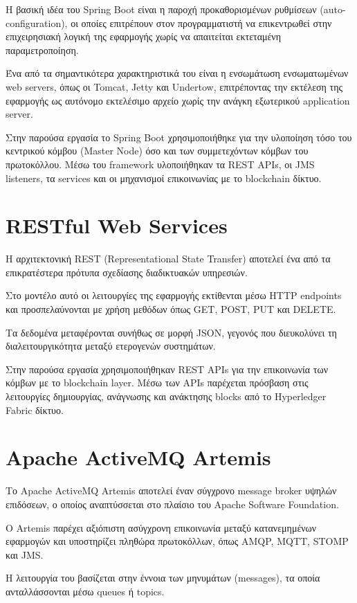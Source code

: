 \documentclass[12pt,a4paper]{report}
\begin{document}
Η βασική ιδέα του Spring Boot είναι η παροχή προκαθορισμένων
ρυθμίσεων (auto-configuration), οι οποίες επιτρέπουν στον
προγραμματιστή να επικεντρωθεί στην επιχειρησιακή λογική της
εφαρμογής χωρίς να απαιτείται εκτεταμένη παραμετροποίηση.

Ένα από τα σημαντικότερα χαρακτηριστικά του είναι η ενσωμάτωση
ενσωματωμένων web servers, όπως οι Tomcat, Jetty και Undertow,
επιτρέποντας την εκτέλεση της εφαρμογής ως αυτόνομο εκτελέσιμο
αρχείο χωρίς την ανάγκη εξωτερικού application server.

Στην παρούσα εργασία το Spring Boot χρησιμοποιήθηκε για την
υλοποίηση τόσο του κεντρικού κόμβου (Master Node) όσο και των
συμμετεχόντων κόμβων του πρωτοκόλλου. Μέσω του framework
υλοποιήθηκαν τα REST APIs, οι JMS listeners, τα services και
οι μηχανισμοί επικοινωνίας με το blockchain δίκτυο.

\section{RESTful Web Services}

Η αρχιτεκτονική REST (Representational State Transfer) αποτελεί
ένα από τα επικρατέστερα πρότυπα σχεδίασης διαδικτυακών υπηρεσιών.

Στο μοντέλο αυτό οι λειτουργίες της εφαρμογής εκτίθενται μέσω
HTTP endpoints και προσπελαύνονται με χρήση μεθόδων όπως GET,
POST, PUT και DELETE.

Τα δεδομένα μεταφέρονται συνήθως σε μορφή JSON, γεγονός που
διευκολύνει τη διαλειτουργικότητα μεταξύ ετερογενών συστημάτων.

Στην παρούσα εργασία χρησιμοποιήθηκαν REST APIs για την
επικοινωνία των κόμβων με το blockchain layer. Μέσω των APIs
παρέχεται πρόσβαση στις λειτουργίες δημιουργίας, ανάγνωσης και
ανάκτησης blocks από το Hyperledger Fabric δίκτυο.

\section{Apache ActiveMQ Artemis}

Το Apache ActiveMQ Artemis αποτελεί έναν σύγχρονο message broker
υψηλών επιδόσεων, ο οποίος αναπτύσσεται στο πλαίσιο του Apache
Software Foundation.

Ο Artemis παρέχει αξιόπιστη ασύγχρονη επικοινωνία μεταξύ
κατανεμημένων εφαρμογών και υποστηρίζει πληθώρα πρωτοκόλλων,
όπως AMQP, MQTT, STOMP και JMS.

Η λειτουργία του βασίζεται στην έννοια των μηνυμάτων
(messages), τα οποία ανταλλάσσονται μέσω queues ή topics.
\end{document}
